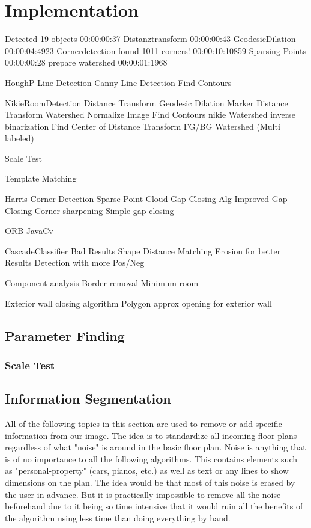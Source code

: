 \section{Implementation}
Detected 19 objects
00:00:00:37
Distanztransform
00:00:00:43
GeodesicDilation
00:00:04:4923
Cornerdetection
found 1011 corners!
00:00:10:10859
Sparsing Points
00:00:00:28
prepare watershed
00:00:01:1968

HoughP Line Detection
Canny Line Detection
Find Contours

NikieRoomDetection
Distance Transform
Geodesic Dilation
Marker Distance Transform
Watershed
Normalize Image
Find Contours nikie
Watershed inverse binarization
Find Center of Distance Transform
FG/BG Watershed (Multi labeled)

Scale Test

Template Matching

Harris Corner Detection
Sparse Point Cloud
Gap Closing Alg
Improved Gap Closing
Corner sharpening
Simple gap closing

ORB
JavaCv

CascadeClassifier
Bad Results
Shape Distance Matching
Erosion for better Results
Detection with more Pos/Neg

Component analysis
Border removal
Minimum room

Exterior wall closing algorithm
Polygon approx
opening for exterior wall





\subsection{Parameter Finding}
\label{subsec:Parameter Finding}
\subsubsection{Scale Test}


\subsection{Information Segmentation}


All of the following topics in this section are used to remove or add specific information from our image. The idea is to standardize all incoming floor plans regardless of what "noise" is around in the basic floor plan. Noise is anything that is of no importance to all the following algorithms. This contains elements such as "personal-property" (cars, pianos, etc.) as well as text or any lines to show dimensions on the plan. The idea would be that most of this noise is erased by the user in advance. But it is practically impossible to remove all the noise beforehand due to it being so time intensive that it would ruin all the benefits of the algorithm using less time than doing everything by hand.


